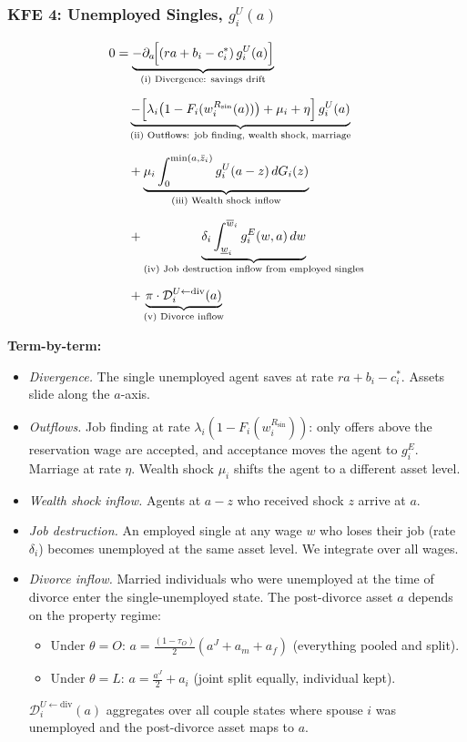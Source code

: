 \documentclass{article}
\begin{document}
\subsubsection*{KFE 4: Unemployed Singles, $g_i^U(a)$}

\begin{align}
    0 &= \underbrace{-\partial_a\!\Big[(ra + b_i - c_i^*)\, g_i^U(a)\Big]}_{\text{(i) Divergence: savings drift}} \notag\\[6pt]
    &\quad \underbrace{- \Big[\lambda_i\big(1-F_i(w_i^{R_{\sin}}(a))\big) + \mu_i + \eta\Big]\, g_i^U(a)}_{\text{(ii) Outflows: job finding, wealth shock, marriage}} \notag\\[6pt]
    &\quad + \underbrace{\mu_i \int_0^{\min(a,\bar{z}_i)} g_i^U(a-z)\, dG_i(z)}_{\text{(iii) Wealth shock inflow}} \notag\\[6pt]
    &\quad + \underbrace{\delta_i \int_{\underline{w}_i}^{\overline{w}_i} g_i^E(w,a)\, dw}_{\text{(iv) Job destruction inflow from employed singles}} \notag\\[6pt]
    &\quad + \underbrace{\pi\cdot\mathcal{D}_i^{U\leftarrow\text{div}}(a)}_{\text{(v) Divorce inflow}}
    \label{eq:KFE_Usin}
\end{align}

\textbf{Term-by-term:}
\begin{itemize}
    \item[(i)] \textit{Divergence.} The single unemployed agent saves at rate $ra + b_i - c_i^*$. Assets slide along the $a$-axis.
    \item[(ii)] \textit{Outflows.} Job finding at rate $\lambda_i(1-F_i(w_i^{R_{\sin}}))$: only offers above the reservation wage are accepted, and acceptance moves the agent to $g_i^E$. Marriage at rate $\eta$. Wealth shock $\mu_i$ shifts the agent to a different asset level.
    \item[(iii)] \textit{Wealth shock inflow.} Agents at $a - z$ who received shock $z$ arrive at $a$.
    \item[(iv)] \textit{Job destruction.} An employed single at any wage $w$ who loses their job (rate $\delta_i$) becomes unemployed at the same asset level. We integrate over all wages.
    \item[(v)] \textit{Divorce inflow.} Married individuals who were unemployed at the time of divorce enter the single-unemployed state. The post-divorce asset $a$ depends on the property regime:
    \begin{itemize}
        \item Under $\theta = O$: $a = \frac{(1-\tau_O)}{2}(a^J + a_m + a_f)$ (everything pooled and split).
        \item Under $\theta = L$: $a = \frac{a^J}{2} + a_i$ (joint split equally, individual kept).
    \end{itemize}
    $\mathcal{D}_i^{U\leftarrow\text{div}}(a)$ aggregates over all couple states where spouse $i$ was unemployed and the post-divorce asset maps to $a$.
\end{itemize}
\end{document}
